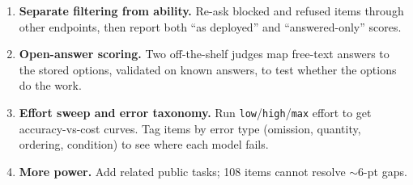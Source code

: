 \documentclass[10pt]{article}
\newcommand{\sect}[1]{\par\vspace{5pt}{\bfseries #1}\par\vspace{1pt}}
\begin{document}
\sect{Next steps (one more week)}
\begin{enumerate}[leftmargin=1.4em]
\item \textbf{Separate filtering from ability.} Re-ask blocked and refused items through
  other endpoints, then report both ``as deployed'' and ``answered-only'' scores.
\item \textbf{Open-answer scoring.} Two off-the-shelf judges map free-text answers to the
  stored options, validated on known answers, to test whether the options do the work.
\item \textbf{Effort sweep and error taxonomy.} Run \texttt{low}/\texttt{high}/\texttt{max}
  effort to get accuracy-vs-cost curves. Tag items by error type (omission, quantity,
  ordering, condition) to see where each model fails.
\item \textbf{More power.} Add related public tasks; 108 items cannot resolve $\sim$6-pt gaps.
\end{enumerate}
\end{document}
